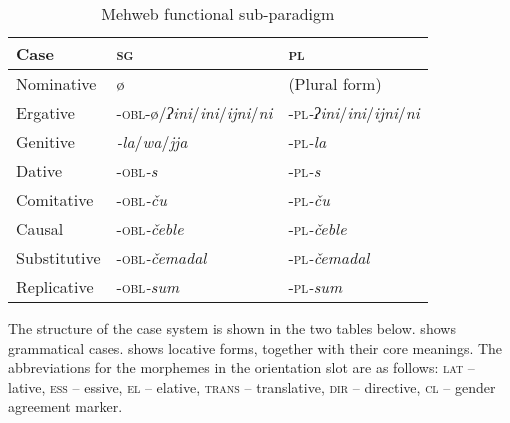 ﻿\documentclass[output=paper]{langsci/langscibook}
\begin{document}
\begin{table}[b]
\vspace{-2\jot}
\caption{Mehweb functional sub-paradigm}\label{tab:3:35}
\begin{tabular}{@{}lll@{}}
\toprule
{Case} & \textsc{sg} & \textsc{pl}\tabularnewline \midrule
{Nominative} & ø & (Plural form)\tabularnewline
{Ergative} & -\textsc{obl}-ø/\emph{ʔini}/\emph{ini}/\emph{ijni}/\emph{ni} &
-\textsc{pl}\emph{-ʔini}/\emph{ini}/\emph{ijni}/\emph{ni}\tabularnewline
{Genitive} & \emph{-la}/\emph{wa}/\emph{jja} &
-\textsc{pl}\emph{-la}\tabularnewline
{Dative} & -\textsc{obl}\emph{-s} & -\textsc{pl}\emph{-s}\tabularnewline
{Comitative} & -\textsc{obl}\emph{-ču} &
-\textsc{pl}\emph{-ču}\tabularnewline
{Causal} & -\textsc{obl}\emph{-čeble} &
-\textsc{pl}\emph{-čeble}\tabularnewline
{Substitutive} & -\textsc{obl}\emph{-čemadal} &
-\textsc{pl}\emph{-čemadal}\tabularnewline
{Replicative} & -\textsc{obl}\emph{-sum} &
-\textsc{pl}\emph{-sum}\tabularnewline
\bottomrule
\end{tabular}
\end{table}

The structure of the case system is shown in the two tables below.
 shows grammatical cases.  shows
locative forms, together with
their core meanings. The abbreviations for the morphemes in the
orientation slot are as follows: \textsc{lat} – lative, \textsc{ess}
– essive, \textsc{el} – elative, \textsc{trans} – translative,
\textsc{dir} – directive, \textsc{cl} – gender agreement marker.
\end{document}
